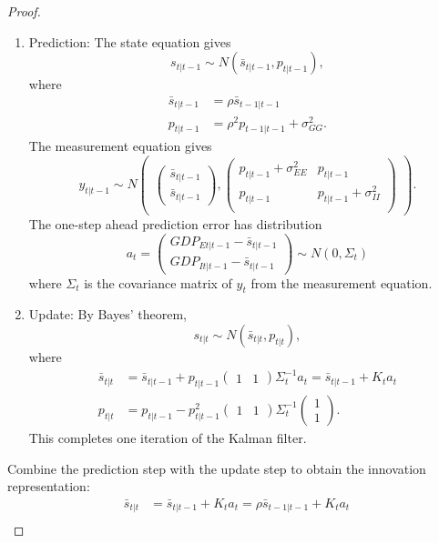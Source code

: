 \documentclass[oneside,reqno]{amsart}
\theoremstyle{definition}
\begin{document}
\begin{enumerate}[label=(\roman*)]
\begin{proof}
\begin{enumerate}[label=(\arabic*)]
\item
Prediction: The state equation gives
\[
	s_{t|t-1} \sim N(\bar s_{t|t-1}, p_{t|t-1}),
\]
where
\begin{align*}
	\bar s_{t|t-1} &= \rho \bar s_{t-1|t-1} \\
	p_{t|t-1} &= \rho^2 p_{t-1|t-1} + \sigma_{GG}^2.
\end{align*}
The measurement equation gives
\[
	y_{t|t-1} \sim N \begin{pmatrix}
		\begin{pmatrix}
			\bar s_{t|t-1} \\
			\bar s_{t|t-1} 
		\end{pmatrix},
		\begin{pmatrix}
			p_{t|t-1} + \sigma_{EE}^2 & p_{t|t-1} \\
			p_{t|t-1}  & p_{t|t-1} + \sigma_{II}^2 \\
		\end{pmatrix}
	\end{pmatrix}.
\]
The one-step ahead prediction error has distribution 
\[
	a_t = \begin{pmatrix}
		GDP_{Et|t-1} - \bar s_{t|t-1}\\
		GDP_{It|t-1} -\bar s_{t|t-1}
	\end{pmatrix} 
	\sim N(0, \Sigma_t)
\]
where $\Sigma_t$ is the covariance matrix of $y_t$ from the measurement equation. 
\item
Update: By Bayes' theorem,
\[
	s_{t|t} \sim N(\bar s_{t|t}, p_{t|t}),
\]
where 
\begin{align*}
	\bar s_{t|t} &= \bar s_{t|t-1} + p_{t|t-1} \begin{pmatrix} 1 & 1 \end{pmatrix} \Sigma_t^{-1} a_t 
		= \bar s_{t|t-1} + K_t a_t \\
	p_{t|t} &= p_{t|t-1} - p_{t|t-1}^2 \begin{pmatrix} 1 & 1 \end{pmatrix}  \Sigma_t^{-1} \begin{pmatrix} 1 \\ 1 \end{pmatrix}.
\end{align*}
This completes one iteration of the Kalman filter.
\end{enumerate}
Combine the prediction step with the update step to obtain the innovation representation:
\begin{align*}
	\bar s_{t|t} &=  \bar s_{t|t-1} + K_t a_t = \rho \bar s_{t-1|t-1} + K_t a_t \\

\end{align*}
\end{proof}
\end{enumerate}
\end{document}
